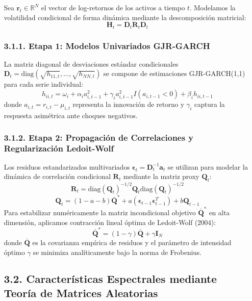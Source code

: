 \documentclass[
  12pt,
]{article}
\begin{document}
Sea \(\mathbf{r}_t \in \mathbb{R}^N\) el vector de log-retornos de los
activos a tiempo \(t\). Modelamos la volatilidad condicional de forma
dinámica mediante la descomposición matricial:
\[\mathbf{H}_t = \mathbf{D}_t \mathbf{R}_t \mathbf{D}_t\]

\subsubsection{3.1.1. Etapa 1: Modelos Univariados
GJR-GARCH}\label{etapa-1-modelos-univariados-gjr-garch}

La matriz diagonal de desviaciones estándar condicionales
\(\mathbf{D}_t = \text{diag}(\sqrt{h_{11,t}}, \dots, \sqrt{h_{NN,t}})\)
se compone de estimaciones GJR-GARCH(1,1) para cada serie individual:
\[h_{ii,t} = \omega_i + \alpha_i a_{i,t-1}^2 + \gamma_i a_{i,t-1}^2 I(a_{i,t-1} < 0) + \beta_i h_{ii,t-1}\]
donde \(a_{i,t} = r_{i,t} - \mu_{i,t}\) representa la innovación de
retorno y \(\gamma_i\) captura la respuesta asimétrica ante choques
negativos.

\subsubsection{3.1.2. Etapa 2: Propagación de Correlaciones y
Regularización
Ledoit-Wolf}\label{etapa-2-propagaciuxf3n-de-correlaciones-y-regularizaciuxf3n-ledoit-wolf}

Los residuos estandarizados multivariados
\(\boldsymbol{\epsilon}_t = \mathbf{D}_t^{-1} \mathbf{a}_t\) se utilizan
para modelar la dinámica de correlación condicional \(\mathbf{R}_t\)
mediante la matriz proxy \(\mathbf{Q}_t\):
\[\mathbf{R}_t = \text{diag}(\mathbf{Q}_t)^{-1/2} \mathbf{Q}_t \text{diag}(\mathbf{Q}_t)^{-1/2}\]
\[\mathbf{Q}_t = (1 - a - b)\bar{\mathbf{Q}}^* + a (\boldsymbol{\epsilon}_{t-1}\boldsymbol{\epsilon}_{t-1}^T) + b \mathbf{Q}_{t-1}\]
Para estabilizar numéricamente la matriz incondicional objetivo
\(\bar{\mathbf{Q}}^*\) en alta dimensión, aplicamos contracción lineal
óptima de Ledoit-Wolf (2004):
\[\bar{\mathbf{Q}}^* = (1 - \gamma)\bar{\mathbf{Q}} + \gamma \mathbf{I}_N\]
donde \(\bar{\mathbf{Q}}\) es la covarianza empírica de residuos y el
parámetro de intensidad óptimo \(\gamma\) se minimiza analíticamente
bajo la norma de Frobenius.

\subsection{3.2. Características Espectrales mediante Teoría de Matrices
Aleatorias}\label{caracteruxedsticas-espectrales-mediante-teoruxeda-de-matrices-aleatorias}
\end{document}
